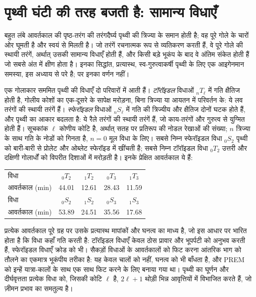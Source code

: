\section{पृथ्वी घंटी की तरह बजती है: सामान्य विधाएँ}

बहुत लंबे आवर्तकाल की पृष्ठ-तरंग की तरंगदैर्घ्य पृथ्वी की त्रिज्या के समान होती है; वह
पूरे गोले के चारों ओर घूमती है और स्वयं से मिलती है। जो तरंगें रचनात्मक रूप से
व्यतिकरण करती हैं, वे पूरे गोले की स्थायी तरंगें, अर्थात् उसकी सामान्य
विधाएँ होती हैं, और किसी बड़े भूकंप के बाद वे अंतिम संकेत होती हैं जो सबसे अंत में क्षीण होता है।
इनका सिद्धांत, प्रत्यास्थ, स्व-गुरुत्वाकर्षी पृथ्वी के लिए एक आइगेनमान समस्या,
इस अध्याय से परे है; पर इनका वर्णन नहीं।

एक गोलाकार सममित पृथ्वी की विधाएँ दो परिवारों में आती हैं। \emph{टॉरॉइडल}
विधाओं ${}_nT_\ell$ में गति क्षैतिज होती है, गोलीय कोशों का एक-दूसरे के सापेक्ष
मरोड़ना, बिना त्रिज्या या आयतन में परिवर्तन के: ये लव तरंगों की स्थायी तरंगें हैं।
\emph{स्फेरॉइडल} विधाओं ${}_nS_\ell$ में गति की त्रिज्यीय और क्षैतिज दोनों घटक होते हैं,
और पृथ्वी का आकार बदलता है: ये रैले तरंगों की स्थायी तरंगें हैं, जो काय-तरंगों
और गुरुत्व से युग्मित होती हैं। सूचकांक $\ell$ कोणीय कोटि है, अर्थात् सतह पर
प्रतिरूप की नोडल रेखाओं की संख्या; $n$ त्रिज्या के साथ गति के नोडों को गिनता है,
$n = 0$ मूल विधा के लिए। सबसे निम्न स्फेरॉइडल विधा ${}_0S_2$ पृथ्वी को बारी-बारी
से प्रोलेट और ओब्लेट स्फेरॉइड में खींचती है; सबसे निम्न टॉरॉइडल
विधा ${}_0T_2$ उत्तरी और दक्षिणी गोलार्धों को
विपरीत दिशाओं में मरोड़ती है। इनके प्रेक्षित आवर्तकाल
ये हैं:
\begin{center}
\small
\begin{tabular}{lcccc}
\hline
विधा & ${}_0T_2$ & ${}_1T_2$ & ${}_0T_3$ & ${}_1T_3$ \\
आवर्तकाल (\unit{min}) & 44.01 & 12.61 & 28.43 & 11.59 \\
\hline
विधा & ${}_0S_2$ & ${}_1S_2$ & ${}_0S_3$ & ${}_1S_3$ \\
आवर्तकाल (\unit{min}) & 53.89 & 24.51 & 35.56 & 17.68 \\
\hline
\end{tabular}
\end{center}
प्रत्येक आवर्तकाल पूरे ग्रह पर उसके प्रत्यास्थ मापांकों और घनत्व का माध्य है, जो
इस आधार पर भारित होता है कि विधा कहाँ गति करती है: टॉरॉइडल विधाएँ केवल
ठोस प्रावार और भूपर्पटी को अनुभव करती हैं, स्फेरॉइडल विधाएँ क्रोड को भी। सैकड़ों
विधाओं के आवर्तकालों को फिट करना आंतरिक भाग को तौलने का एकमात्र भूकंपीय तरीका है:
यह केवल चालों को नहीं, घनत्व को भी बाँधता है, और PREM को इन्हें यात्रा-कालों के साथ
एक साथ फिट करने के लिए बनाया गया था। पृथ्वी का घूर्णन और दीर्घवृत्तता
प्रत्येक विधा को, जिसकी कोटि $\ell$ है, $2\ell + 1$ थोड़ी भिन्न आवृत्तियों में विभाजित करते हैं, जो
ज़ीमन प्रभाव का समतुल्य है।

